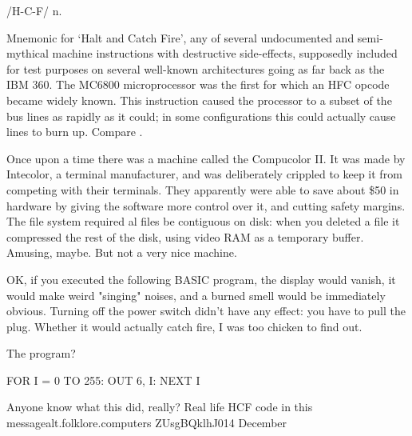  /H-C-F/ n.

Mnemonic for `Halt and Catch Fire', any of several undocumented and
semi-mythical machine instructions with destructive side-effects, supposedly
included for test purposes on several well-known architectures going as far
back as the IBM 360. The MC6800 microprocessor was the first for which an HFC
opcode became widely known. This instruction caused the processor to
 a subset of the bus lines as rapidly as it could; in some
configurations this could actually cause lines to burn up. Compare
.

\begin{new}
	\begin{usenet}
		Once upon a time there was a machine called the Compucolor II. It was
		made by Intecolor, a terminal manufacturer, and was deliberately
		crippled to keep it from competing with their terminals. They
		apparently were able to save about \$50 in hardware by giving the
		software more control over it, and cutting safety margins. The file
		system required al files be contiguous on disk: when you deleted a file
		it compressed the rest of the disk, using video RAM as a temporary
		buffer. Amusing, maybe. But not a very nice machine.

		OK, if you executed the following BASIC program, the display would
		vanish, it would make weird "singing" noises, and a burned smell would
		be immediately obvious. Turning off the power switch didn't have any
		effect: you have to pull the plug. Whether it would actually catch
		fire, I was too chicken to find out.

		The program?

		\begin{usenet}
			FOR I = 0 TO 255: OUT 6, I: NEXT I
		\end{usenet}

		Anyone know what this did, really?
			{Real life HCF code in this message}{alt.folklore.computers}
			{ZUsgBQklhJ0}{14 December}
	\end{usenet}
\end{new}

